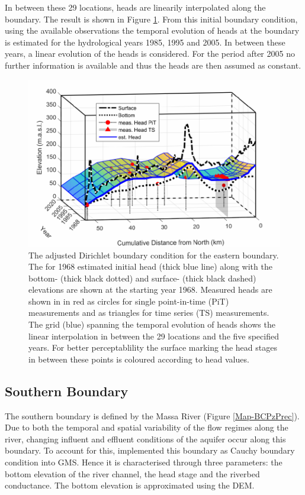 In between these 29 locations, heads are linearily interpolated along the boundary. 
The result is shown in Figure \ref{Fig-EastB}. 
From this initial boundary condition, using the available observations the temporal evolution of heads at the boundary is estimated for the hydrological years 1985, 1995 and 2005. 
In between these years, a linear evolution of the heads is considered. 
For the period after 2005 no further information is available and thus the heads are then assumed as constant.

\begin{figure}[h]
    \centering
    \includegraphics{./img/Fig-EasternBoundary.pdf}
    \caption{The adjusted Dirichlet boundary condition for the eastern boundary. The for 1968 estimated initial head (thick blue line) along with the bottom- (thick black dotted) and surface- (thick black dashed) elevations are shown at the starting year 1968. Measured heads are shown in in red as circles for single point-in-time (PiT) measurements and as triangles for time series (TS) measurements. The grid (blue) spanning the temporal evolution of heads shows the linear interpolation in between the 29 locations and the five specified years. For better perceptablility the surface marking the head stages in between these points is coloured according to head values.}
    \label{Fig-EastB}
\end{figure}

\subsection{Southern Boundary}

The southern boundary is defined by the Massa River (Figure \ref{Map-BCPzPrec}). 
Due to both the temporal and spatial variability of the flow regimes along the river, changing influent and effluent conditions of the aquifer occur along this boundary. 
To account for this, \cite{Horn.2021} implemented this boundary as Cauchy boundary condition into GMS. 
Hence it is characterised through three parameters: the bottom elevation of the river channel, the head stage and the riverbed conductance. 
The bottom elevation is approximated using the DEM.


